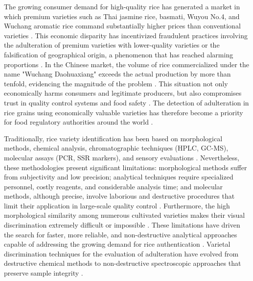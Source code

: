 \documentclass[final,5p,times,twocolumn]{elsarticle}
\begin{document}
The growing consumer demand for high-quality rice has generated a market in which premium varieties such as Thai jasmine rice, basmati, Wuyou No.4, and Wuchang aromatic rice command substantially higher prices than conventional varieties \cite{Teye2022, Tong2021, Sun2025, Zaresani2024}. 
This economic disparity has incentivized fraudulent practices involving the adulteration of premium varieties with lower-quality varieties or the falsification of geographical origin, a phenomenon that has reached alarming proportions \cite{Teye2022, SliwinskaBartel2021}. 
In the Chinese market, the volume of rice commercialized under the name "Wuchang Daohuaxiang" exceeds the actual production by more than tenfold, evidencing the magnitude of the problem \cite{Sun2025, Li2025}. 
This situation not only economically harms consumers and legitimate producers, but also compromises trust in quality control systems and food safety \cite{Shi2025, Rahmani2022, SliwinskaBartel2021}. 
The detection of adulteration in rice grains using economically valuable varieties has therefore become a priority for food regulatory authorities around the world \cite{Teye2022, Edris2024}.

Traditionally, rice variety identification has been based on morphological methods, chemical analysis, chromatographic techniques (HPLC, GC-MS), molecular assays (PCR, SSR markers), and sensory evaluations \cite{Shi2025, Sampaio2019, Giang2020b}. 
Nevertheless, these methodologies present significant limitations: morphological methods suffer from subjectivity and low precision; analytical techniques require specialized personnel, costly reagents, and considerable analysis time; and molecular methods, although precise, involve laborious and destructive procedures that limit their application in large-scale quality control \cite{Rahmani2022, Giang2020b}. 
Furthermore, the high morphological similarity among numerous cultivated varieties makes their visual discrimination extremely difficult or impossible \cite{Onmarkhong2022, Tong2021, Shi2022}. 
These limitations have driven the search for faster, more reliable, and non-destructive analytical approaches capable of addressing the growing demand for rice authentication \cite{Shi2025, Dehbasteh2025, Cazzaniga2026}. 
Varietal discrimination techniques for the evaluation of adulteration have evolved from destructive chemical methods to non-destructive spectroscopic approaches that preserve sample integrity \cite{Weng2020, Kang2024, Zhao2024}.
\end{document}
